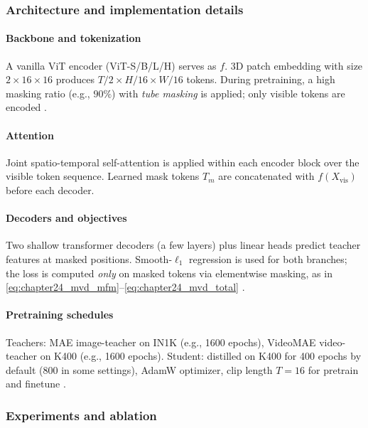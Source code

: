 \begin{enrichment}
\begin{enrichment}
            \subsubsection{Architecture and implementation details}
            \label{subsubsec:chapter24_mvd_arch}
            
            \paragraph{Backbone and tokenization}
            A vanilla ViT encoder (ViT-S/B/L/H) serves as $f$. 3D patch embedding with size $2\times16\times16$ produces $T/2\times H/16\times W/16$ tokens. During pretraining, a high masking ratio (e.g., $90\%$) with \emph{tube masking} is applied; only visible tokens are encoded \cite{wang2023_mvd,tong2022_videomae}.
            
            \paragraph{Attention}
            Joint spatio-temporal self-attention is applied within each encoder block over the visible token sequence. Learned mask tokens $T_m$ are concatenated with $f(X_{\text{vis}})$ before each decoder.
            
            \paragraph{Decoders and objectives}
            Two shallow transformer decoders (a few layers) plus linear heads predict teacher features at masked positions. Smooth-$\ell_1$ regression is used for both branches; the loss is computed \emph{only} on masked tokens via elementwise masking, as in \eqref{eq:chapter24_mvd_mfm}–\eqref{eq:chapter24_mvd_total} \cite{wang2023_mvd}.
            
            \paragraph{Pretraining schedules}
            Teachers: MAE image-teacher on IN1K (e.g., 1600 epochs), VideoMAE video-teacher on K400 (e.g., 1600 epochs). Student: distilled on K400 for 400 epochs by default (800 in some settings), AdamW optimizer, clip length $T{=}16$ for pretrain and finetune \cite{wang2023_mvd}.
            
            \subsubsection{Experiments and ablation}
            \label{subsubsec:chapter24_mvd_experiments}
            

\end{enrichment}
\end{enrichment}
